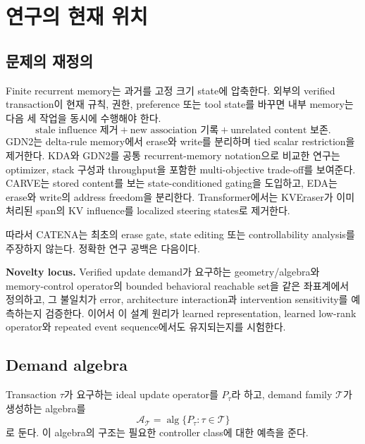 \documentclass[10.3pt,a4paper]{article}
\begin{document}
\tableofcontents
\newpage

\section{연구의 현재 위치}
\subsection{문제의 재정의}
Finite recurrent memory는 과거를 고정 크기 state에 압축한다. 외부의 verified transaction이 현재 규칙, 권한, preference 또는 tool state를 바꾸면 내부 memory는 다음 세 작업을 동시에 수행해야 한다.
\[
\text{stale influence 제거}
+\text{new association 기록}
+\text{unrelated content 보존}.
\]
GDN2는 delta-rule memory에서 erase와 write를 분리하며 tied scalar restriction을 제거한다\citep{gdn22026}. KDA와 GDN2를 공통 recurrent-memory notation으로 비교한 연구는 optimizer, stack 구성과 throughput을 포함한 multi-objective trade-off를 보여준다\citep{mechanisms2026}. CARVE는 stored content를 보는 state-conditioned gating을 도입하고\citep{carve2026}, EDA는 erase와 write의 address freedom을 분리한다\citep{eda2026}. Transformer에서는 KVEraser가 이미 처리된 span의 KV influence를 localized steering states로 제거한다\citep{kveraser2026}.

따라서 CATENA는 최초의 erase gate, state editing 또는 controllability analysis를 주장하지 않는다. 정확한 연구 공백은 다음이다.

\begin{claimbox}
\textbf{Novelty locus.} Verified update demand가 요구하는 geometry/algebra와 memory-control operator의 bounded behavioral reachable set을 같은 좌표계에서 정의하고, 그 불일치가 error, architecture interaction과 intervention sensitivity를 예측하는지 검증한다. 이어서 이 설계 원리가 learned representation, learned low-rank operator와 repeated event sequence에서도 유지되는지를 시험한다.
\end{claimbox}

\subsection{Demand algebra}
Transaction $\tau$가 요구하는 ideal update operator를 $P_\tau$라 하고, demand family $\mathcal T$가 생성하는 algebra를
\[
\mathcal A_{\mathcal T}=\operatorname{alg}\{P_\tau:\tau\in\mathcal T\}
\]
로 둔다. 이 algebra의 구조는 필요한 controller class에 대한 예측을 준다.
\end{document}
